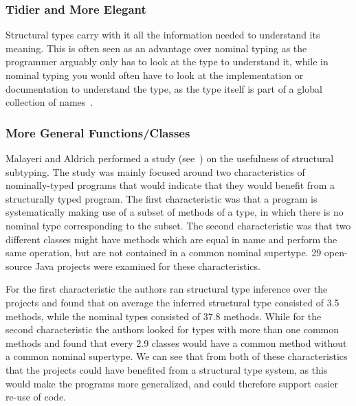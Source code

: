 \subsubsection{Tidier and More Elegant}\label{subsubsec:tidier-and-more-elegant}

Structural types carry with it all the information needed to understand its meaning.
This is often seen as an advantage over nominal typing as the programmer arguably only has to look at the type to understand it, while in nominal typing you would often have to look at the implementation or documentation to understand the type, as the type itself is part of a global collection of names~\cite{tapl}.

%

\subsubsection{More General Functions/Classes}\label{subsubsec:more-general-functions}

Malayeri and Aldrich performed a study (see~\cite{malayeri}) on the usefulness of structural subtyping.
The study was mainly focused around two characteristics of nominally-typed programs that would indicate that they would benefit from a structurally typed program.
The first characteristic was that a program is systematically making use of a subset of methods of a type, in which there is no nominal type corresponding to the subset.
The second characteristic was that two different classes might have methods which are equal in name and perform the same operation, but are not contained in a common nominal supertype.
29 open-source Java projects were examined for these characteristics.

For the first characteristic the authors ran structural type inference over the projects and found that on average the inferred structural type consisted of 3.5 methods, while the nominal types consisted of 37.8 methods.
While for the second characteristic the authors looked for types with more than one common methods and found that every 2.9 classes would have a common method without a common nominal supertype.
We can see that from both of these characteristics that the projects could have benefited from a structural type system, as this would make the programs more generalized, and could therefore support easier re-use of code.

